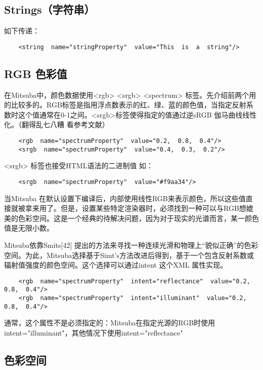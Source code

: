 \subsection{Strings（字符串）}
如下传递：
\begin{lstlisting}
	<string  name="stringProperty"  value="This  is  a  string"/>
\end{lstlisting}

\subsection{RGB 色彩值}
在Mitsuba中，颜色数据使用<rgb> <srgb> <spectrum> 标签。先介绍前两个用的比较多的。RGB标签是指用浮点数表示的红、绿、蓝的颜色值，当指定反射系数时这个值通常在0-1之间。<srgb>标签使得指定的值通过逆sRGB 伽马曲线线性化。（翻得乱七八糟 看参考文献）
\begin{lstlisting}
	<rgb  name="spectrumProperty"  value="0.2,  0.8,  0.4"/>
	<srgb  name="spectrumProperty"  value="0.4,  0.3,  0.2"/>
\end{lstlisting}

<srgb> 标签也接受HTML语法的二进制值 如：

\begin{lstlisting}
	<srgb  name="spectrumProperty"  value="#f9aa34"/>
\end{lstlisting}
\par
当Mitsuba 在默认设置下编译后，内部使用线性RGB来表示颜色，所以这些值直接就被拿来用了。但是，设置某些特定渲染器时，必须找到一种可以与RGB想媲美的色彩空间。这是一个经典的待解决问题，因为对于现实的光谱而言，某一颜色值是无限小数。
\par
Mitsuba依靠Smits[42] 提出的方法来寻找一种连续光滑和物理上“貌似正确”的色彩空间。为此，Mitsuba选择基于Simt’s方法改进后得到，基于一个包含反射系数或辐射值强度的颜色空间。这个选择可以通过intent 这个XML 属性实现。

\begin{lstlisting}
	<rgb  name="spectrumProperty"  intent="reflectance"  value="0.2,  0.8,  0.4"/>
	<rgb  name="spectrumProperty"  intent="illuminant"  value="0.2,  0.8,  0.4"/>
\end{lstlisting}

\par 
通常，这个属性不是必须指定的：Mitsuba在指定光源的RGB时使用intent="illuminant"，其他情况下使用intent="reflectance"

\subsection{色彩空间}

